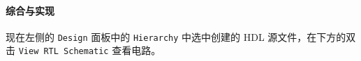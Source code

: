 \documentclass{ctexart}
\begin{document}
        \paragraph{综合与实现}

        现在左侧的 \verb|Design| 面板中的 \verb|Hierarchy| 中选中创建的 HDL 源文件，在下方的双击 \verb|View RTL Schematic| 查看电路。

        
\end{document}
